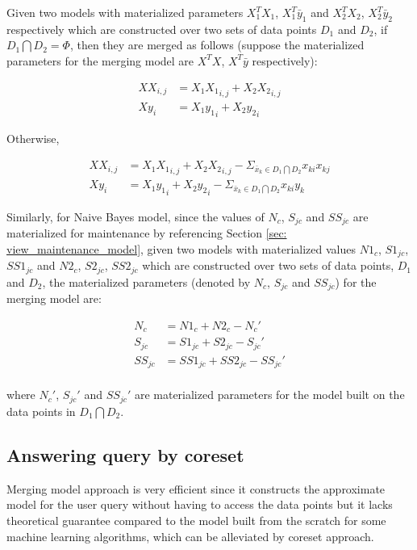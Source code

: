 Given two models with materialized parameters $X_1^TX_1$, $X_1^T\bar{y}_1$ and $X_2^TX_2$, $X_2^T\bar{y}_2$ respectively which are constructed over two sets of data points $D_1$ and $D_2$, if $D_1 \bigcap D_2 = \Phi$, then they are merged as follows (suppose the materialized parameters for the merging model are $X^TX$, $X^T\bar{y}$ respectively):

\begin{equation}
\begin{split}
{XX}_{i,j} &= {X_1X_1}_{i,j} + {X_2X_2}_{i,j}\\
{Xy}_{i} &= {X_1y_1}_{i} + {X_2y_2}_{i}
\end{split}
\end{equation}

Otherwise,

\begin{equation}
\begin{split}
{XX}_{i,j} &= {X_1X_1}_{i,j} + {X_2X_2}_{i,j} - \Sigma_{\bar{x}_k \in D_1 \bigcap D_2}x_{ki}x_{kj} \\
{Xy}_{i} &= {X_1y_1}_{i} + {X_2y_2}_{i} - \Sigma_{\bar{x}_k \in D_1 \bigcap D_2}x_{ki}y_{k} 
\end{split}
\end{equation}


Similarly, for Naive Bayes model, since the values of $N_c$, $S_{jc}$ and $SS_{jc}$ are materialized for maintenance by referencing Section \ref{sec: view_maintenance_model}, given two models with materialized values $N1_c$, $S1_{jc}$, $SS1_{jc}$ and $N2_c$, $S2_{jc}$, $SS2_{jc}$ which are constructed over two sets of data points, $D_1$ and $D_2$, the materialized parameters (denoted by $N_c$, $S_{jc}$ and $SS_{jc}$) for the merging model are:

\begin{equation}
\begin{split}
N_c &= N1_c + N2_c-N_c'\\
S_{jc} &= S1_{jc} + S2_{jc}-S_{jc}'\\
SS_{jc} &= SS1_{jc} + SS2_{jc}-SS_{jc}'\\
\end{split}
\end{equation}

where $N_c'$, $S_{jc}'$ and $SS_{jc}'$ are materialized parameters for the model built on the data points in $D_1 \bigcap D_2$.

\subsection{Answering query by coreset}
Merging model approach is very efficient since it constructs the approximate model for the user query without having to access the data points but it lacks theoretical guarantee compared to the model built from the scratch for some machine learning algorithms, which can be alleviated by coreset approach.


